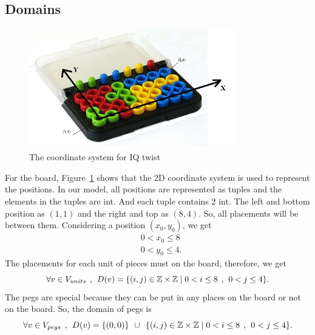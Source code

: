 \subsection{Domains}
\begin{figure}[htbp]
\centering
\includegraphics[width=0.8\textwidth]{figs/IQtwistboard.jpg}
\caption{The coordinate system for IQ twist}
    \label{fig:coordinate}
\end{figure}
For the board, Figure~\ref{fig:coordinate} shows that the 2D coordinate system is used to represent the positions. In our model, all positions are represented as tuples and the elements in the tuples are int. And each tuple contains 2 int. The left and bottom position as $(1,1)$ and the right and top as $(8,4)$. So, all placements will be between them. Considering a position $(x_{0},y_{0})$, we get
\begin{equation}
\begin{aligned}
&0<x_{0} \leq 8\\
&0<y_{0} \leq 4.
\end{aligned}
\end{equation}
The placements for each unit of pieces must on the board, therefore, we get
\begin{equation}
\forall  v \in V_{units} \hspace{1ex},\hspace{1ex} D(v)=\{(i,j) \in \mathbb{Z} \times \mathbb{Z}	\mid  0<i \leq 8 \hspace{1ex} , \hspace{1ex} 0<j \leq 4\}.\\
\end{equation}
The pegs are special because they can be put in any places on the board or not on the board. So, the domain of pegs is
\begin{equation}
\forall  v \in V_{pegs} \hspace{1ex},\hspace{1ex} D(v)=\{(0,0)\} \hspace{1ex} \cup \hspace{1ex}\{(i,j) \in \mathbb{Z} \times \mathbb{Z}\mid  0<i \leq 8 \hspace{1ex} , \hspace{1ex} 0<j \leq 4\}.
\end{equation}
